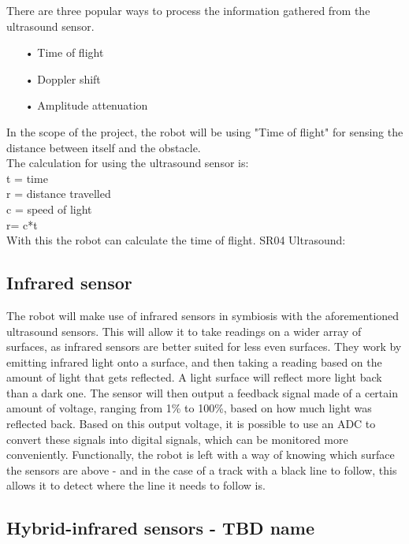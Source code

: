 There are three popular ways to process the information gathered from the ultrasound sensor. \\

\begin{enumerate}
	\item[•]Time of flight
	\item[•]Doppler shift
	\item[•]Amplitude attenuation
\end{enumerate}

In the scope of the project, the robot will be using "Time of flight" for sensing the distance between itself and the obstacle.\\

The calculation for using the ultrasound sensor is: \\

t = time\\
r = distance travelled\\
c = speed of light\\

r= c*t\\

With this the robot can calculate the time of flight.
SR04 Ultrasound:\\

\subsection{Infrared sensor}

The robot will make use of infrared sensors in symbiosis with the aforementioned ultrasound sensors. This will allow it to take readings on a wider array of surfaces, as infrared sensors are better suited for less even surfaces. They work by emitting infrared light onto a surface, and then taking a reading based on the amount of light that gets reflected. A light surface will reflect more light back than a dark one. The sensor will then output a feedback signal made of a certain amount of voltage, ranging from 1\% to 100\%, based on how much light was reflected back. Based on this output voltage, it is possible to use an ADC to convert these signals into digital signals, which can be monitored more conveniently. Functionally, the robot is left with a way of knowing which surface the sensors are above - and in the case of a track with a black line to follow, this allows it to detect where the line it needs to follow is.\\

\subsection{Hybrid-infrared sensors - TBD name}

